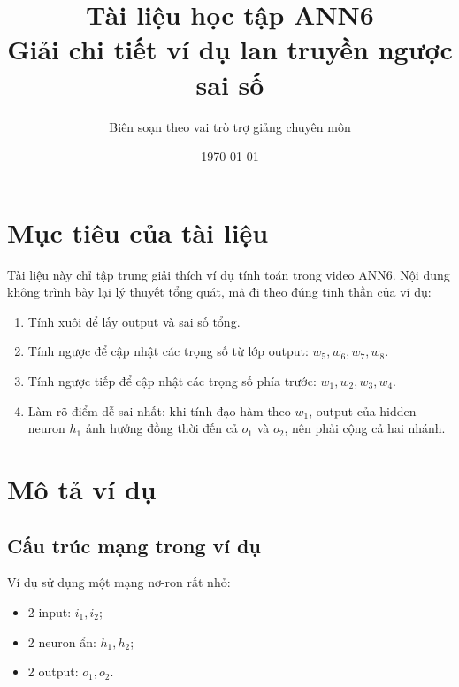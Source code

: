 \documentclass[12pt,a4paper]{report}
\title{
    \textbf{Tài liệu học tập ANN6}\\
    \large Giải chi tiết ví dụ lan truyền ngược sai số
}
\author{Biên soạn theo vai trò trợ giảng chuyên môn}
\date{\today}
\begin{document}
\maketitle
\tableofcontents
\newpage

\chapter*{Mục tiêu của tài liệu}

Tài liệu này chỉ tập trung giải thích ví dụ tính toán trong video ANN6. Nội dung không trình bày lại lý thuyết tổng quát, mà đi theo đúng tinh thần của ví dụ:

\begin{enumerate}[label=\arabic*.]
    \item Tính xuôi để lấy output và sai số tổng.
    \item Tính ngược để cập nhật các trọng số từ lớp output: $w_5,w_6,w_7,w_8$.
    \item Tính ngược tiếp để cập nhật các trọng số phía trước: $w_1,w_2,w_3,w_4$.
    \item Làm rõ điểm dễ sai nhất: khi tính đạo hàm theo $w_1$, output của hidden neuron $h_1$ ảnh hưởng đồng thời đến cả $o_1$ và $o_2$, nên phải cộng cả hai nhánh.
\end{enumerate}

\chapter{Mô tả ví dụ}

\section{Cấu trúc mạng trong ví dụ}

Ví dụ sử dụng một mạng nơ-ron rất nhỏ:

\begin{itemize}
    \item 2 input: $i_1,i_2$;
    \item 2 neuron ẩn: $h_1,h_2$;
    \item 2 output: $o_1,o_2$.
\end{itemize}
\end{document}
